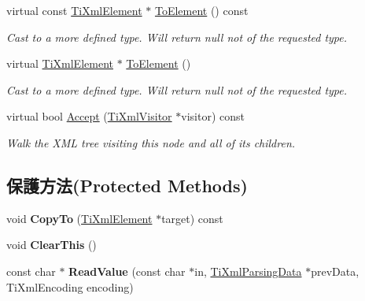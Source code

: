 \begin{DoxyCompactItemize}
\item 
virtual const \hyperlink{class_ti_xml_element}{Ti\+Xml\+Element} $\ast$ \hyperlink{class_ti_xml_element_ac5b8d0e25fa23fd9acbb6d146082901c}{To\+Element} () const \hypertarget{class_ti_xml_element_ac5b8d0e25fa23fd9acbb6d146082901c}{}\label{class_ti_xml_element_ac5b8d0e25fa23fd9acbb6d146082901c}

\begin{DoxyCompactList}\small\item\em Cast to a more defined type. Will return null not of the requested type. \end{DoxyCompactList}\item 
virtual \hyperlink{class_ti_xml_element}{Ti\+Xml\+Element} $\ast$ \hyperlink{class_ti_xml_element_a9def86337ea7a755eb41cac980f60c7a}{To\+Element} ()\hypertarget{class_ti_xml_element_a9def86337ea7a755eb41cac980f60c7a}{}\label{class_ti_xml_element_a9def86337ea7a755eb41cac980f60c7a}

\begin{DoxyCompactList}\small\item\em Cast to a more defined type. Will return null not of the requested type. \end{DoxyCompactList}\item 
virtual bool \hyperlink{class_ti_xml_element_a31ab28cc3b892a69254391d6bbe08df3}{Accept} (\hyperlink{class_ti_xml_visitor}{Ti\+Xml\+Visitor} $\ast$visitor) const \hypertarget{class_ti_xml_element_a31ab28cc3b892a69254391d6bbe08df3}{}\label{class_ti_xml_element_a31ab28cc3b892a69254391d6bbe08df3}

\begin{DoxyCompactList}\small\item\em Walk the X\+ML tree visiting this node and all of its children. \end{DoxyCompactList}\end{DoxyCompactItemize}
\subsection*{保護方法(Protected Methods)}
\begin{DoxyCompactItemize}
\item 
void {\bfseries Copy\+To} (\hyperlink{class_ti_xml_element}{Ti\+Xml\+Element} $\ast$target) const \hypertarget{class_ti_xml_element_a9e0c1983b840de4134f1f6bf7af00b0f}{}\label{class_ti_xml_element_a9e0c1983b840de4134f1f6bf7af00b0f}

\item 
void {\bfseries Clear\+This} ()\hypertarget{class_ti_xml_element_a5670933ec2d7d9763b9891acc05d7f7d}{}\label{class_ti_xml_element_a5670933ec2d7d9763b9891acc05d7f7d}

\item 
const char $\ast$ {\bfseries Read\+Value} (const char $\ast$in, \hyperlink{class_ti_xml_parsing_data}{Ti\+Xml\+Parsing\+Data} $\ast$prev\+Data, Ti\+Xml\+Encoding encoding)\hypertarget{class_ti_xml_element_ac786bce103042d3837c4cc2ff6967d41}{}\label{class_ti_xml_element_ac786bce103042d3837c4cc2ff6967d41}

\end{DoxyCompactItemize}
